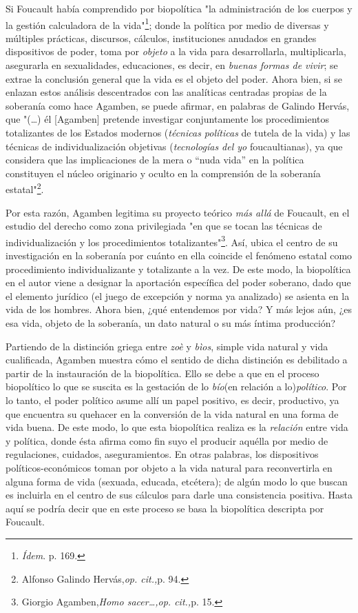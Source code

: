 Si Foucault había comprendido por biopolítica "la administración de los
cuerpos y la gestión calculadora de la vida"\footnote{\emph{Ídem}. p.
  169.}; donde la política por medio de diversas y múltiples prácticas,
discursos, cálculos, instituciones anudados en grandes dispositivos de
poder, toma por \emph{objeto} a la vida para desarrollarla,
multiplicarla, asegurarla en sexualidades, educaciones, es decir, en
\emph{buenas formas de vivir}; se extrae la conclusión general que la
vida es el objeto del poder. Ahora bien, si se enlazan estos análisis
descentrados con las analíticas centradas propias de la soberanía como
hace Agamben, se puede afirmar, en palabras de Galindo Hervás, que
"(\dots) él {[}Agamben{]} pretende investigar conjuntamente los
procedimientos totalizantes de los Estados modernos (\emph{técnicas
políticas} de tutela de la vida) y las técnicas de individualización
objetivas (\emph{tecnologías del yo} foucaultianas), ya que considera
que las implicaciones de la mera o ``nuda vida'' en la política
constituyen el núcleo originario y oculto en la comprensión de la
soberanía estatal"\footnote{Alfonso Galindo Hervás,\emph{op. cit.,}p.
  94.}.

Por esta razón, Agamben legitima su proyecto teórico \emph{más allá} de
Foucault, en el estudio del derecho como zona privilegiada "en que se
tocan las técnicas de individualización y los procedimientos
totalizantes"\footnote{Giorgio Agamben,\emph{Homo sacer\ldots,op.
  cit.,}p. 15.}. Así, ubica el centro de su investigación en la
soberanía por cuánto en ella coincide el fenómeno estatal como
procedimiento individualizante y totalizante a la vez. De este modo, la
biopolítica en el autor viene a designar la aportación específica del
poder soberano, dado que el elemento jurídico (el juego de excepción y
norma ya analizado) se asienta en la vida de los hombres. Ahora bien,
¿qué entendemos por vida? Y más lejos aún, ¿es esa vida, objeto de la
soberanía, un dato natural o su más íntima producción?

Partiendo de la distinción griega entre \emph{zoè} y \emph{bìos}, simple
vida natural y vida cualificada, Agamben muestra cómo el sentido de
dicha distinción es debilitado a partir de la instauración de la
biopolítica. Ello se debe a que en el proceso biopolítico lo que se
suscita es la gestación de lo \emph{bío}(en relación a
lo)\emph{político}. Por lo tanto, el poder político asume allí un papel
positivo, es decir, productivo, ya que encuentra su quehacer en la
conversión de la vida natural en una forma de vida buena. De este modo,
lo que esta biopolítica realiza es la \emph{relación} entre vida y
política, donde ésta afirma como fin suyo el producir aquélla por medio
de regulaciones, cuidados, aseguramientos. En otras palabras, los
dispositivos políticos-económicos toman por objeto a la vida natural
para reconvertirla en alguna forma de vida (sexuada, educada, etcétera);
de algún modo lo que buscan es incluirla en el centro de sus cálculos
para darle una consistencia positiva. Hasta aquí se podría decir que en
este proceso se basa la biopolítica descripta por Foucault.

